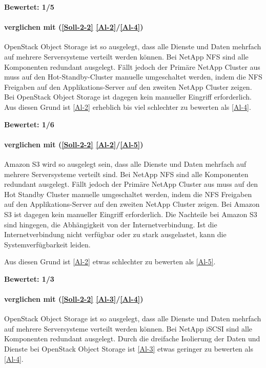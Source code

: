 \textbf{Bewertet: 1/5}

\paragraph*{  verglichen mit  (\ref{Soll-2-2} \ref{Al-2}/\ref{Al-4})}
OpenStack Object Storage ist so ausgelegt, dass alle Dienste und Daten mehrfach auf mehrere Serversysteme verteilt werden können. Bei NetApp NFS sind alle Komponenten redundant ausgelegt. Fällt jedoch der Primäre NetApp Cluster aus muss auf den Hot-Standby-Cluster manuelle umgeschaltet werden, indem die NFS Freigaben auf den Applikations-Server auf den zweiten NetApp Cluster zeigen. Bei OpenStack Object Storage ist dagegen kein manueller Eingriff erforderlich. Aus diesen Grund ist  \ref{Al-2} erheblich bis viel schlechter zu bewerten als  \ref{Al-4}.

\textbf{Bewertet: 1/6}

\paragraph*{  verglichen mit  (\ref{Soll-2-2} \ref{Al-2}/\ref{Al-5})}
Amazon S3 wird so ausgelegt sein, dass alle Dienste und Daten mehrfach auf mehrere Serversysteme verteilt sind. Bei NetApp NFS sind alle Komponenten redundant ausgelegt. Fällt jedoch der Primäre NetApp Cluster aus muss auf den Hot Standby Cluster manuelle umgeschaltet werden, indem die NFS Freigaben auf den Applikations-Server auf den zweiten NetApp Cluster zeigen. Bei Amazon S3 ist dagegen kein manueller Eingriff erforderlich. Die Nachteile bei Amazon S3 sind hingegen, die Abhängigkeit von der Internetverbindung. Ist die Internetverbindung nicht verfügbar oder zu stark ausgelastet, kann die Systemverfügbarkeit leiden.

Aus diesen Grund ist  \ref{Al-2} etwas schlechter zu bewerten als  \ref{Al-5}.

\textbf{Bewertet: 1/3}

\paragraph*{  verglichen mit  (\ref{Soll-2-2} \ref{Al-3}/\ref{Al-4})}
OpenStack Object Storage ist so ausgelegt, dass alle Dienste und Daten mehrfach auf mehrere Serversysteme verteilt werden können. Bei NetApp iSCSI sind alle Komponenten redundant ausgelegt. Durch die dreifache Isolierung der Daten und Dienste bei OpenStack Object Storage ist  \ref{Al-3} etwas geringer zu bewerten als  \ref{Al-4}.

